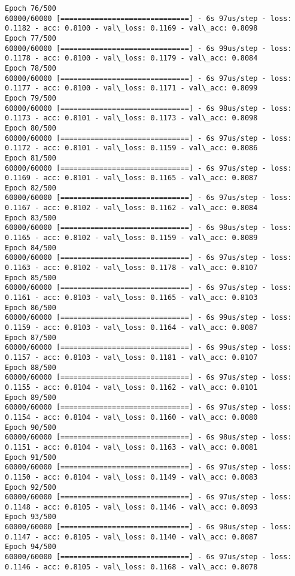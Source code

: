 \documentclass[11pt]{article}
\begin{document}
\begin{Verbatim}[commandchars=\\\{\}]
Epoch 76/500
60000/60000 [==============================] - 6s 97us/step - loss: 0.1182 - acc: 0.8100 - val\_loss: 0.1169 - val\_acc: 0.8098
Epoch 77/500
60000/60000 [==============================] - 6s 99us/step - loss: 0.1178 - acc: 0.8100 - val\_loss: 0.1179 - val\_acc: 0.8084
Epoch 78/500
60000/60000 [==============================] - 6s 97us/step - loss: 0.1177 - acc: 0.8100 - val\_loss: 0.1171 - val\_acc: 0.8099
Epoch 79/500
60000/60000 [==============================] - 6s 98us/step - loss: 0.1173 - acc: 0.8101 - val\_loss: 0.1173 - val\_acc: 0.8098
Epoch 80/500
60000/60000 [==============================] - 6s 97us/step - loss: 0.1172 - acc: 0.8101 - val\_loss: 0.1159 - val\_acc: 0.8086
Epoch 81/500
60000/60000 [==============================] - 6s 97us/step - loss: 0.1169 - acc: 0.8101 - val\_loss: 0.1165 - val\_acc: 0.8087
Epoch 82/500
60000/60000 [==============================] - 6s 97us/step - loss: 0.1167 - acc: 0.8102 - val\_loss: 0.1162 - val\_acc: 0.8084
Epoch 83/500
60000/60000 [==============================] - 6s 98us/step - loss: 0.1165 - acc: 0.8102 - val\_loss: 0.1159 - val\_acc: 0.8089
Epoch 84/500
60000/60000 [==============================] - 6s 97us/step - loss: 0.1163 - acc: 0.8102 - val\_loss: 0.1178 - val\_acc: 0.8107
Epoch 85/500
60000/60000 [==============================] - 6s 97us/step - loss: 0.1161 - acc: 0.8103 - val\_loss: 0.1165 - val\_acc: 0.8103
Epoch 86/500
60000/60000 [==============================] - 6s 99us/step - loss: 0.1159 - acc: 0.8103 - val\_loss: 0.1164 - val\_acc: 0.8087
Epoch 87/500
60000/60000 [==============================] - 6s 99us/step - loss: 0.1157 - acc: 0.8103 - val\_loss: 0.1181 - val\_acc: 0.8107
Epoch 88/500
60000/60000 [==============================] - 6s 97us/step - loss: 0.1155 - acc: 0.8104 - val\_loss: 0.1162 - val\_acc: 0.8101
Epoch 89/500
60000/60000 [==============================] - 6s 97us/step - loss: 0.1154 - acc: 0.8104 - val\_loss: 0.1160 - val\_acc: 0.8080
Epoch 90/500
60000/60000 [==============================] - 6s 98us/step - loss: 0.1151 - acc: 0.8104 - val\_loss: 0.1163 - val\_acc: 0.8081
Epoch 91/500
60000/60000 [==============================] - 6s 97us/step - loss: 0.1150 - acc: 0.8104 - val\_loss: 0.1149 - val\_acc: 0.8083
Epoch 92/500
60000/60000 [==============================] - 6s 97us/step - loss: 0.1148 - acc: 0.8105 - val\_loss: 0.1146 - val\_acc: 0.8093
Epoch 93/500
60000/60000 [==============================] - 6s 98us/step - loss: 0.1147 - acc: 0.8105 - val\_loss: 0.1140 - val\_acc: 0.8087
Epoch 94/500
60000/60000 [==============================] - 6s 97us/step - loss: 0.1146 - acc: 0.8105 - val\_loss: 0.1168 - val\_acc: 0.8078

\end{Verbatim}
\end{document}
